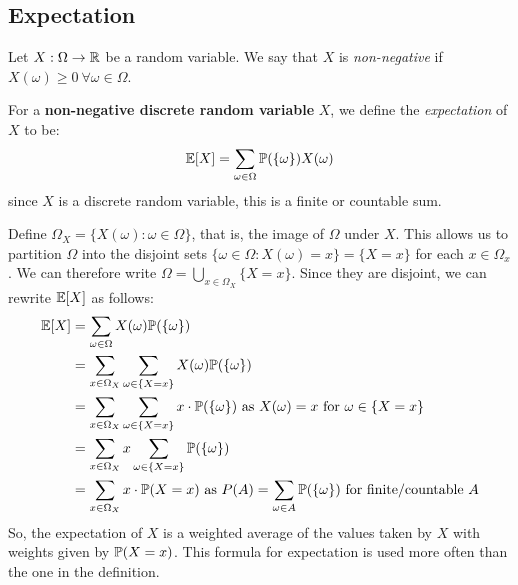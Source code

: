 \documentclass[../main.tex]{subfiles}
\begin{document}
\subsection{Expectation}
\label{discreteExpectation}
\begin{definition}
  Let $X: \Omega \to \R$ be a random variable.
  We say that $X$ is \textit{non-negative} if $X(\omega) \geq 0\ \forall \omega \in \Omega$.
\end{definition}
\begin{definition}
  For a \textbf{non-negative discrete random variable} $X$, we define the \textit{expectation} of $X$ to be:
  \label{nonNegativeExpectation}
  \[
    \E[X] = \sum_{\omega \in \Omega} \P(\{\omega\})X(\omega)
  \]
  since $X$ is a discrete random variable, this is a finite or countable sum.
\end{definition}
Define $\Omega_X = \{X(\omega): \omega \in \Omega\}$, that is, the image of $\Omega$ under $X$.
This allows us to partition $\Omega$ into the disjoint sets $\{\omega \in \Omega: X(\omega) = x\} = \{X = x\}$ for each $x \in \Omega_x$.
We can therefore write $\Omega = \bigcup_{x \in \Omega_X} \{X = x\}$.
Since they are disjoint, we can rewrite $\E[X]$ as follows:
\label{expectationPartition}
\begin{align*}
  \E[X] &= \sum_{\omega \in \Omega} X(\omega) \P(\{\omega\}) \\
        &= \sum_{x \in \Omega_X} \sum_{\omega \in \{X = x\}} X(\omega)\P(\{\omega\}) \\
        &= \sum_{x \in \Omega_X} \sum_{\omega \in \{X = x\}} x \cdot \P(\{\omega\}) \text{ as $X(\omega) = x$ for $\omega \in \{X = x\}$} \\
        &= \sum_{x \in \Omega_X} x \sum_{\omega \in \{X = x\}} \P(\{\omega\}) \\
        &= \sum_{x \in \Omega_X} x \cdot \P(X = x) \text{ as $P(A) = \sum_{\omega \in A} \P(\{\omega\})$ for finite/countable $A$}
\end{align*}
So, the expectation of $X$ is a weighted average of the values taken by $X$ with weights given by $\P(X = x)$.
This formula for expectation is used more often than the one in the definition.
\end{document}
